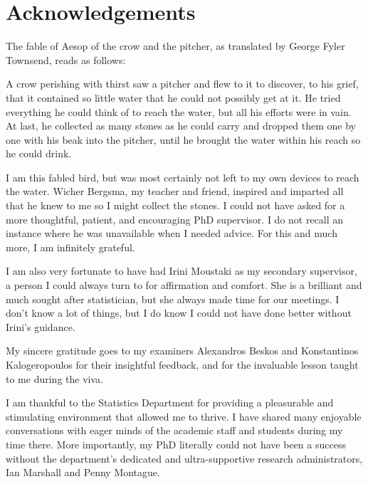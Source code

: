 \documentclass[11pt,twoside,openright]{report}
\begin{document}
\chapter*{Acknowledgements} 

The fable of Aesop of the crow and the pitcher, as translated by George Fyler Townsend, reads as follows:

\begingroup
\singlespacing
\begin{displayquote}
A crow perishing with thirst saw a pitcher and flew to it to discover, to his grief, that it contained so little water that he could not possibly get at it. 
He tried everything he could think of to reach the water, but all his efforts were in vain. 
At last, he collected as many stones as he could carry and dropped them one by one with his beak into the pitcher, until he brought the water within his reach so he could drink.
\end{displayquote}
\endgroup

\noindent I am this fabled bird, but was most certainly not left to my own devices to reach the water.
Wicher Bergsma, my teacher and friend, inspired and imparted all that he knew to me so I might collect the stones.
I could not have asked for a more thoughtful, patient, and encouraging PhD supervisor.
I do not recall an instance where he was unavailable when I needed  advice.
For this and much more, I am infinitely grateful.


I am also very fortunate to have had Irini Moustaki as my secondary supervisor, a person I could always turn to for affirmation and comfort.
She is a brilliant and much sought after statistician, but she always made time for our meetings.
I don't know a lot of things, but I do know I could not have done better without Irini's guidance.

My sincere gratitude goes to my examiners Alexandros Beskos and Konstantinos Kalogeropoulos for their insightful feedback, and for the invaluable lesson taught to me during the viva.

I am thankful to the Statistics Department for providing a pleasurable and stimulating environment that allowed me to thrive.
I have shared many enjoyable conversations with eager minds of the academic staff and students during my time there.
More importantly, my PhD literally could not have been a success without the department's dedicated and ultra-supportive research administrators, Ian Marshall and Penny Montague.
\end{document}
